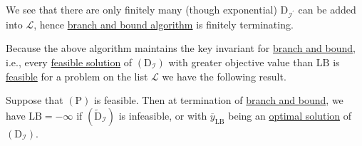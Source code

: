\begin{remark}
	We see that there are only finitely many (though exponential) \(\mathrm{D}_{\mathcal{I} ^\prime}\) can be added into \(\mathcal{L} \), hence \hyperref[algo:branch-and-bound-algorithm]{branch and bound algorithm} is finitely terminating.
\end{remark}

Because the above algorithm maintains the key invariant for \hyperref[algo:branch-and-bound-algorithm]{branch and bound}, i.e., every \hyperref[def:feasible-solution]{feasible solution} of \((\mathrm{D}_{\mathcal{I} } )\) with greater objective value than \(\mathrm{LB}\) is \hyperref[def:feasible-solution]{feasible} for a problem on the list \(\mathcal{L} \) we have the following result.
\begin{theorem}\label{thm:lec23-1}
	Suppose that \((\mathrm{P})\) is feasible. Then at termination of \hyperref[algo:branch-and-bound-algorithm]{branch and bound}, we have \(\mathrm{LB}=-\infty\) if \((\widetilde{\mathrm{D}} _\mathcal{I})\) is infeasible, or with \(\overline{y} _{\mathrm{LB}}\) being an \hyperref[def:optimal-solution]{optimal solution} of \((\mathrm{D}_{\mathcal{I} } )\).
\end{theorem}


